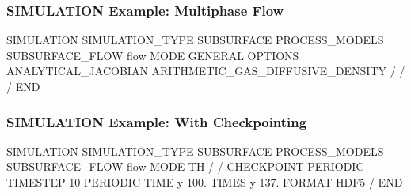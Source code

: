 \begin{frame}[fragile]\frametitle{SIMULATION Example: Multiphase Flow}

\begin{semiverbatim}
SIMULATION
  SIMULATION_TYPE SUBSURFACE
  PROCESS_MODELS
    SUBSURFACE_FLOW flow
      MODE GENERAL
      OPTIONS
        ANALYTICAL_JACOBIAN
        ARITHMETIC_GAS_DIFFUSIVE_DENSITY
      /
    /
  /
END
\end{semiverbatim}

\end{frame}

\begin{frame}[fragile]\frametitle{SIMULATION Example: With Checkpointing}
\begin{semiverbatim}
SIMULATION
  SIMULATION_TYPE SUBSURFACE
  PROCESS_MODELS
    SUBSURFACE_FLOW flow
      MODE TH
    /
  /
  CHECKPOINT
    PERIODIC TIMESTEP 10
    PERIODIC TIME y 100.
    TIMES y 137.
    FORMAT HDF5
  /
END
\end{semiverbatim}

\end{frame}
